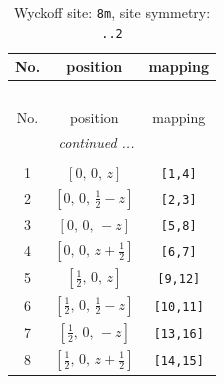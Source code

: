 \documentclass[fleqn,8pt]{jsarticle}
\begin{document}
\begin{longtable}{ccc}
\caption{Wyckoff site: {\tt 8m}, site symmetry: {\tt ..2}}
 \\
 \hline \hline
No. & position & mapping \\ \hline \endfirsthead

\multicolumn{2}{l}{\tablename\ \thetable{}} \\
 \hline \hline
No. & position & mapping \\ \hline \endhead

 \hline \hline
\multicolumn{2}{r}{\footnotesize\it continued ...} \\ \endfoot

 \hline \hline
\multicolumn{2}{r}{} \\ \endlastfoot

1 & $\left[ 0,\, 0,\, z \right]$ & {\tt [1,4]} \\ \hline
2 & $\left[ 0,\, 0,\, \frac{1}{2} - z \right]$ & {\tt [2,3]} \\ \hline
3 & $\left[ 0,\, 0,\, - z \right]$ & {\tt [5,8]} \\ \hline
4 & $\left[ 0,\, 0,\, z + \frac{1}{2} \right]$ & {\tt [6,7]} \\ \hline
5 & $\left[ \frac{1}{2},\, 0,\, z \right]$ & {\tt [9,12]} \\ \hline
6 & $\left[ \frac{1}{2},\, 0,\, \frac{1}{2} - z \right]$ & {\tt [10,11]} \\ \hline
7 & $\left[ \frac{1}{2},\, 0,\, - z \right]$ & {\tt [13,16]} \\ \hline
8 & $\left[ \frac{1}{2},\, 0,\, z + \frac{1}{2} \right]$ & {\tt [14,15]} \\
\end{longtable}
\renewcommand{\arraystretch}{1.2}
\end{document}
